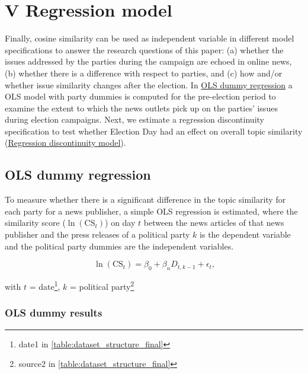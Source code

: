 \documentclass[
]{article}
\begin{document}
\hypertarget{v-regression-model}{%
\section{V Regression model}\label{v-regression-model}}

Finally, cosine similarity can be used as independent variable in
different model specifications to answer the research questions of this
paper: (a) whether the issues addressed by the parties during the
campaign are echoed in online news, (b) whether there is a difference
with respect to parties, and (c) how and/or whether issue similarity
changes after the election. In
\protect\hyperlink{ols-dummy-regression}{OLS dummy regression} a OLS
model with party dummies is computed for the pre-election period to
examine the extent to which the news outlets pick up on the parties'
issues during election campaigns. Next, we estimate a regression
discontinuity specification to test whether Election Day had an effect
on overall topic similarity
(\protect\hyperlink{regression-discontinuity-model}{Regression
discontinuity model}).

\hypertarget{ols-dummy-regression}{%
\subsection{OLS dummy regression}\label{ols-dummy-regression}}

To measure whether there is a significant difference in the topic
similarity for each party for a news publisher, a simple OLS regression
is estimated, where the similarity score (\(\ln(\text{CS}_{t})\)) on day
\(t\) between the news articles of that news publisher and the press
releases of a political party \(k\) is the dependent variable and the
political party dummies are the independent variables.

\[
\ln(\text{CS}_{t})=\beta_0+\beta_nD_{t,k-1}+\epsilon_t\text{,}
\]

with \(t\) = date\footnote{date1 in
  \autoref{table:dataset_structure_final}}, \(k\) = political
party\footnote{source2 in \autoref{table:dataset_structure_final}}

\hypertarget{ols-dummy-results}{%
\subsubsection{OLS dummy results}\label{ols-dummy-results}}
\end{document}
